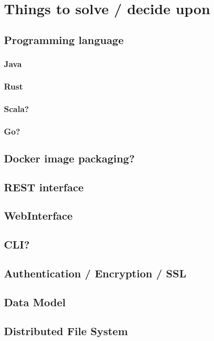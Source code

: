 \chapter{Things to solve / decide upon}

\section{Programming language}

\subsection{Java}
\subsection{Rust}
\subsection{Scala?}
\subsection{Go?}

\section{Docker image packaging?}

\section{REST interface}

\section{WebInterface}

\section{CLI?}

\section{Authentication / Encryption / SSL}

\section{Data Model}

\section{Distributed File System}

